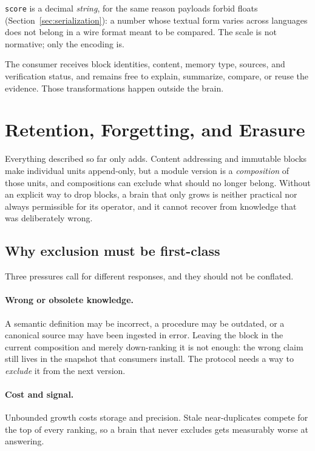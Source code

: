 \documentclass[11pt,a4paper]{article}
\begin{document}
\texttt{score} is a decimal \emph{string}, for the same reason payloads forbid
floats (Section~\ref{sec:serialization}): a number whose textual form varies
across languages does not belong in a wire format meant to be compared. The
scale is not normative; only the encoding is.

The consumer receives block identities, content, memory type, sources, and
verification status, and remains free to explain, summarize, compare, or reuse
the evidence. Those transformations happen outside the brain.

\section{Retention, Forgetting, and Erasure}
\label{sec:forgetting}

Everything described so far only adds. Content addressing and immutable blocks
make individual units append-only, but a module version is a \emph{composition}
of those units, and compositions can exclude what should no longer belong.
Without an explicit way to drop blocks, a brain that only grows is neither
practical nor always permissible for its operator, and it cannot recover from
knowledge that was deliberately wrong.

\subsection{Why exclusion must be first-class}

Three pressures call for different responses, and they should not be conflated.

\paragraph{Wrong or obsolete knowledge.}
A semantic definition may be incorrect, a procedure may be outdated, or a
canonical source may have been ingested in error. Leaving the block in the
current composition and merely down-ranking it is not enough: the wrong claim
still lives in the snapshot that consumers install. The protocol needs a way to
\emph{exclude} it from the next version.

\paragraph{Cost and signal.}
Unbounded growth costs storage and precision. Stale near-duplicates compete for
the top of every ranking, so a brain that never excludes gets measurably worse
at answering.
\end{document}
